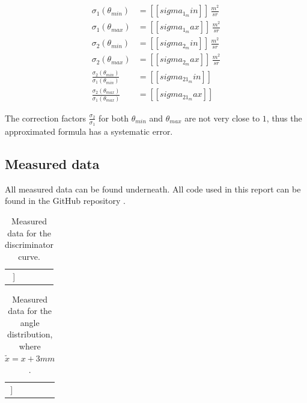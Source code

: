 \documentclass[a4paper]{article}
\begin{document}
\begin{align}
\sigma_1(\theta_{min}) &= [[sigma_1_min]] \, \frac{m^2}{sr} \\
\sigma_1(\theta_{max}) &= [[sigma_1_max]] \, \frac{m^2}{sr} \\
\sigma_2(\theta_{min}) &= [[sigma_2_min]] \, \frac{m^2}{sr} \\
\sigma_2(\theta_{max}) &= [[sigma_2_max]] \, \frac{m^2}{sr} \\
\frac{\sigma_2(\theta_{min})}{\sigma_1(\theta_{min})} &= [[sigma_21_min]] \\
\frac{\sigma_2(\theta_{max})}{\sigma_1(\theta_{max})} &= [[sigma_21_max]]
\end{align}

The correction factors $\frac{\sigma_2}{\sigma_1}$ for both $\theta_{min}$ and $\theta_{max}$ are not very close to $1$, thus the approximated formula has a systematic error.

\subsection{Measured data}

All measured data can be found underneath.
\newline
All code used in this report can be found in the GitHub repository \cite{github}.

\begin{table}[H]
\centering
\begin{tabular}{r|rr|r}
\hline
[[table:discriminatorCurve]]
\end{tabular}
\caption{Measured data for the discriminator curve.}
\end{table}

\begin{table}[H]
\centering
\begin{tabular}{rr|rr|r}
\hline
[[table:angleDistribution]]
\end{tabular}
\caption{Measured data for the angle distribution, where $\tilde{x} = x + 3mm$.}
\end{table}
\end{document}
